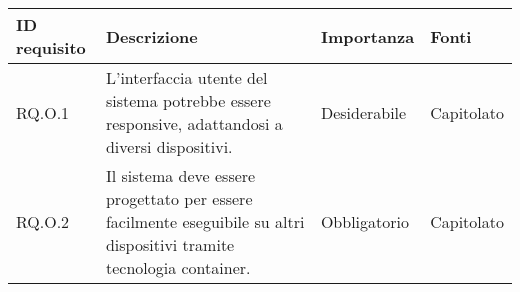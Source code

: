 \begin{table}[H]
    \begin{tabular}{|C{2.7cm}|L{7.2cm}|C{2.7cm}|C{2cm}|}
        \hline
        \textbf{ID requisito} & \textbf{Descrizione} & \textbf{Importanza} & \textbf{Fonti}  \\
        \hline
       
        \hline
        RQ.O.1 & L'interfaccia utente del sistema potrebbe essere responsive, adattandosi a diversi dispositivi. & Desiderabile & Capitolato \\
        \hline
        RQ.O.2 & Il sistema deve essere progettato per essere facilmente eseguibile su altri dispositivi tramite tecnologia container. & Obbligatorio & Capitolato \\
        \hline
        
        \end{tabular}

\end{table}